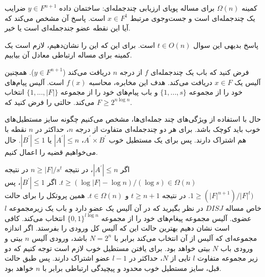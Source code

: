 \begin{example}
 کمینه  $\Omega(n)$ برای مساله پویای ارزیابی چندجمله‌ای: ساختمان داده $y \in F^{n+1}$ ضرایب یک چندجمله‌ای است و جست‌وجوی مرتبط $x \in F^{1}$ است. پاسخ آن مشخص می‌کند که آیا این نقطه عضو جندجمله‌ای است یا خیر.

 پاسخ بدیهی این  سوال $t \in O(n)$ است. برای این که این را نشان‌دهیم، لازم است یک کمینه برای مساله ارتباطی معادل آن بیابیم. 
 
 فرض کنید که باب یک چندجمله‌ای $f$ از درجه $n$ دریافت می‌کند ($y \in F^{n+1}$). 
 همچنین آلیس یک $x\in F$ دریافت می‌کند.
  هدف این مخابره، محاسبه $f(x)$ است. 
  آلیس پیام‌های خود را از مجموعه $\{1,...,s\}$ و باب پیام‌های خود را از مجموعه $\{1,...,|F|\}$ انتخاب می‌کند. 
  حالتی را فرض کنید که $F \geq 2^{n \log n}$. 
 
 حال با استفاده از ویژگی‌های چند جمله‌ای‌ها، مشخص می‌کنیم چگونه سایز مستطیل‌های خوب باید کوچک باشد. برای هر دو چندجمله‌ای متفاوت از درجه $n$، حداکثر در $n$ نقطه با هم اشتراک دارند. پس برای یک مستطیل خوب 
 $A^{'} \times B^{'}$، $|A^{'}| \leq n$ یا $|B^{'}|\leq 1$.  حال می‌خواهیم قضیه را اعمال کنیم. 
 
 اگر $|A^{'}| \leq n$، در نتیجه $n \geq |F|/s^{t}$ در نتیجه $t \geq (\log |F| - \log n) / (\log s) \in \Omega(n)$. اگر $|B^{'}| \leq 1$، پس $1 \geq (|F|^{n+1})/ |F|^{t})$. در نتیجه $t \geq n+1$ و $t \in \Omega(n)$. 
 همین پروتکل را برای حالت خاص مساله $DISJ$ در نظر بگیرید که در آن آلیس یک عضو دارد و باب یک زیرمجموعه $l$ عضوی. آلیس مجموعه پیغام‌های خود را از مجموعه $\{0,1\}^{l\log{n}}$ انتخاب می‌کند. کافی است نشان دهیم بهترین حالت این که آلیس کل ورودی را بفرستد. اگر اندازه مجموعه‌ای که آلیس از آن انتخاب می‌کند برابر با $N = 2^{n}$ باشد، ورودی آلیس $n$ بیتی و ورودی باب $N$  بیتی خواهد بود. برای یافتن مستطیل خوب لازم است توجه کنیم که دو زیر مجموعه متفاوت $l$ تایی از $N$، حداکثر در $l-1$ عضو اشتراک دارند. پس طبق حالت قبل، سایز مستطیل خوب محدود و پیچیدگی ارتباطی برابر با $n$ خواهد بود.
  \end{example}